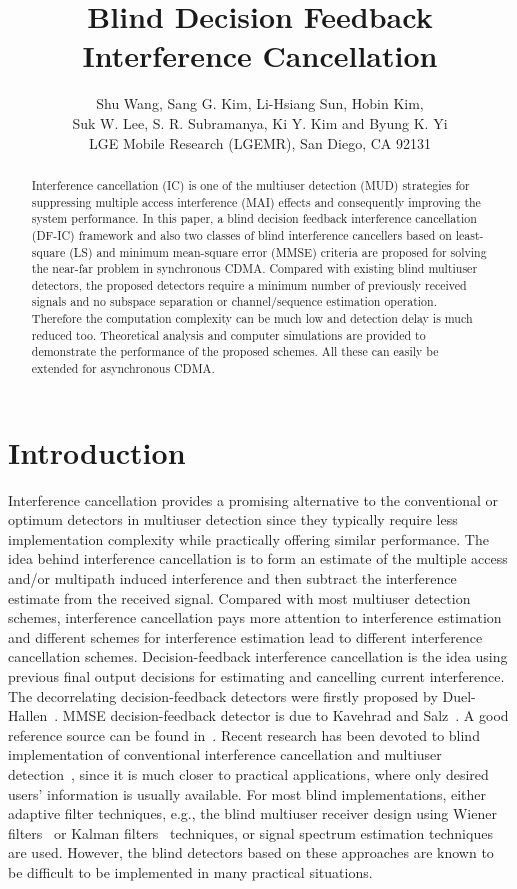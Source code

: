 \documentclass[a4paper,10pt,fleqn, twocolumn]{IEEETran}
\title{Blind Decision Feedback Interference Cancellation}
\author{Shu Wang, Sang G. Kim, Li-Hsiang Sun, Hobin Kim,\\
   Suk W. Lee, S. R. Subramanya, Ki Y. Kim and Byung K. Yi\\ LGE Mobile Research (LGEMR), San Diego, CA 92131}
\date{}
\begin{document}
\maketitle
\begin{abstract}\small
Interference cancellation (IC) is one of the multiuser detection
(MUD) strategies for suppressing multiple access interference
(MAI) effects and consequently improving the system performance.
In this paper, a blind decision feedback interference cancellation
(DF-IC) framework and also two classes of blind interference
cancellers based on least-square (LS) and minimum mean-square
error (MMSE) criteria are proposed for solving the near-far
problem in synchronous CDMA. Compared with existing blind
multiuser detectors, the proposed detectors require a minimum
number of previously received signals and no subspace separation
or channel/sequence estimation operation. Therefore the
computation complexity can be much low and detection delay is much
reduced too. Theoretical analysis and computer simulations are
provided to demonstrate the performance of the proposed schemes.
All these can easily be extended for asynchronous CDMA.
\end{abstract}
\section{Introduction}
Interference cancellation provides a promising alternative to the
conventional or optimum detectors in multiuser detection since
they typically require less implementation complexity while
practically offering similar performance. The idea behind
interference cancellation is to form an estimate of the multiple
access and/or multipath induced interference and then subtract the
interference estimate from the received signal. Compared with most
multiuser detection schemes, interference cancellation pays more
attention to interference estimation and different schemes for
interference estimation lead to different interference
cancellation schemes. Decision-feedback interference cancellation
is the idea using previous final output decisions for estimating
and cancelling current interference. The decorrelating
decision-feedback detectors were firstly proposed by
Duel-Hallen~\cite{Duel93,Duel95}. MMSE decision-feedback detector
is due to Kavehrad and Salz~\cite{Kave85}. A good reference source
can be found in~\cite{Verd98}. Recent research has been devoted to
blind implementation of conventional interference cancellation and
multiuser detection~\cite{Madh94,Wang98,Wang99,Zhang02}, since it
is much closer to practical applications, where only desired
users' information is usually available. For most blind
implementations, either adaptive filter techniques, e.g., the
blind multiuser receiver design using Wiener filters~\cite{Madh94}
or Kalman filters~\cite{Zhang02} techniques, or signal spectrum
estimation techniques~\cite{Wang98,Wang99} are used. However, the
blind detectors based on these approaches are known to be
difficult to be implemented in many practical situations.
\end{document}
